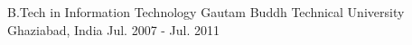 

\begin{cventries}

  \cventry
    {B.Tech in Information Technology} %
    {Gautam Buddh Technical University} %
    {Ghaziabad, India} %
    {Jul. 2007 - Jul. 2011} %
    {
      \begin{cvitems} %
      \end{cvitems}
    }

\end{cventries}
